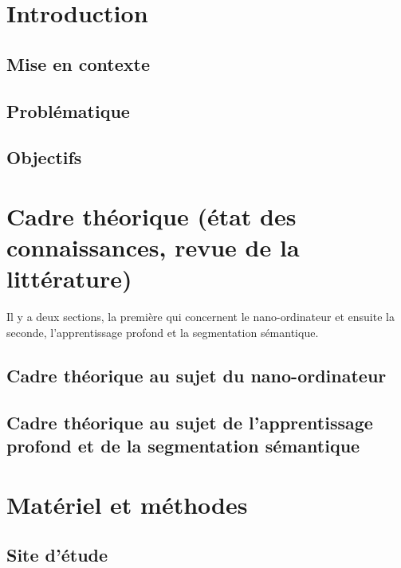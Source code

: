 \documentclass[12pt, letterpaper]{article}
\begin{document}
\newpage
{}

\section{Introduction}
\subsection{Mise en contexte}

\subsection{Problématique}

\subsection{Objectifs}


\section{Cadre théorique (état des connaissances, revue de la littérature)}
Il y a deux sections, la première qui concernent le nano-ordinateur et ensuite la seconde, l'apprentissage profond et la segmentation sémantique.
\subsection{Cadre théorique au sujet du nano-ordinateur}

\subsection{Cadre théorique au sujet de l'apprentissage profond et de la segmentation sémantique}


\section{Matériel et méthodes}
\subsection{Site d'étude}

\end{document}
